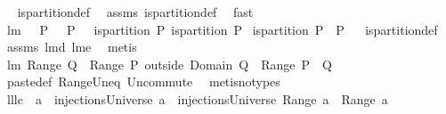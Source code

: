 \begin{isabellebody}
\isadelimproof
\ %
\endisadelimproof
%
\isatagproof
{}\isamarkupfalse%
\ is{\isacharunderscore}partition{\isacharunderscore}def\ \isamarkupfalse%
\ assms\ is{\isacharunderscore}partition{\isacharunderscore}def\ \isamarkupfalse%
\ fast%
\endisatagproof
{\isafoldproof}%
%
\isadelimproof
%
\endisadelimproof
\isanewline
\isanewline
{}\isamarkupfalse%
\ lm{}{}{\isacharcolon}\ \ {\isachardoublequoteopen}{\isasymUnion}\ P{}\ {\isasyminter}\ {\isacharparenleft}{\isasymUnion}\ P{}{\isacharparenright}\ {\isacharequal}\ {\isacharbraceleft}{\isacharbraceright}{\isachardoublequoteclose}\ {\isachardoublequoteopen}is{\isacharunderscore}partition\ P{}{\isachardoublequoteclose}\ {\isachardoublequoteopen}is{\isacharunderscore}partition\ P{}{\isachardoublequoteclose}\isanewline
{}\ {\isachardoublequoteopen}is{\isacharunderscore}partition\ {\isacharparenleft}P{}\ {\isasymunion}\ P{}{\isacharparenright}{\isachardoublequoteclose}%
\isadelimproof
\ %
\endisadelimproof
%
\isatagproof
{}\isamarkupfalse%
\ is{\isacharunderscore}partition{\isacharunderscore}def\ \isamarkupfalse%
\ assms\ lm{}{}d\ lm{}{}e\ \isamarkupfalse%
\ metis%
\endisatagproof
{\isafoldproof}%
%
\isadelimproof
%
\endisadelimproof
\isanewline
\isanewline
{}\isamarkupfalse%
\ lm{}{}{\isacharcolon}\ {\isachardoublequoteopen}Range\ Q\ {\isasymunion}\ {\isacharparenleft}Range\ {\isacharparenleft}P\ outside\ {\isacharparenleft}Domain\ Q{\isacharparenright}{\isacharparenright}{\isacharparenright}\ {\isacharequal}\ Range\ {\isacharparenleft}P\ {\isacharplus}{\isacharasterisk}\ Q{\isacharparenright}{\isachardoublequoteclose}\isanewline
%
\isadelimproof
%
\endisadelimproof
%
\isatagproof
{}\isamarkupfalse%
\ paste{\isacharunderscore}def\ Range{\isacharunderscore}Un{\isacharunderscore}eq\ Un{\isacharunderscore}commute\ \isamarkupfalse%
\ {\isacharparenleft}metis{\isacharparenleft}no{\isacharunderscore}types{\isacharparenright}{\isacharparenright}%
\endisatagproof
{\isafoldproof}%
%
\isadelimproof
\isanewline
%
\endisadelimproof
\isanewline
{}\isamarkupfalse%
\ lll{}{}c{\isacharcolon}\ \ {\isachardoublequoteopen}a{}\ {\isasymin}\ injectionsUniverse{\isachardoublequoteclose}\ {\isachardoublequoteopen}a{}\ {\isasymin}\ injectionsUniverse{\isachardoublequoteclose}\ {\isachardoublequoteopen}Range\ a{}\ {\isasyminter}\ {\isacharparenleft}Range\ a{}{\isacharparenright}{\isacharequal}{\isacharbraceleft}{\isacharbraceright}{\isachardoublequoteclose}\isanewline

\end{isabellebody}
